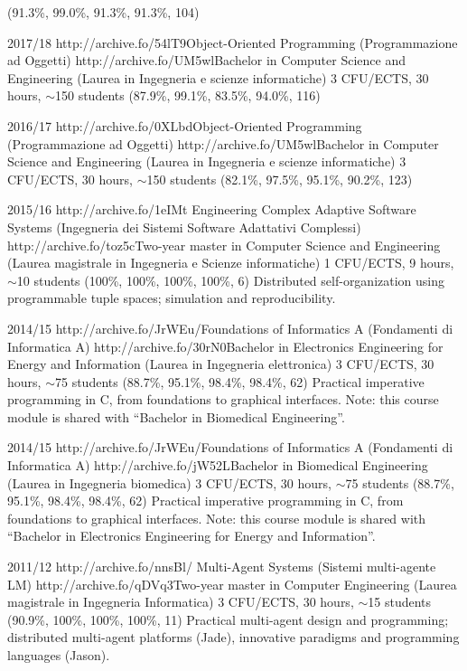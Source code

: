 \begin{outerlist}
        {(91.3\%, 99.0\%, 91.3\%, 91.3\%, 104)}
        {\oopjava}
    \item[2017/18]
        \unibocourse
        {http://archive.fo/54lT9}{Object-Oriented Programming (Programmazione ad Oggetti)}
        {http://archive.fo/UM5wl}{Bachelor in Computer Science and Engineering (Laurea in Ingegneria e scienze informatiche)}
        {3 CFU/ECTS, 30 hours, $\sim$150 students}
        {(87.9\%, 99.1\%, 83.5\%, 94.0\%, 116)}
        {\oopjava}
    \item[2016/17]
        \unibocourse
        {http://archive.fo/0XLbd}{Object-Oriented Programming (Programmazione ad Oggetti)}
        {http://archive.fo/UM5wl}{Bachelor in Computer Science and Engineering (Laurea in Ingegneria e scienze informatiche)}
        {3 CFU/ECTS, 30 hours, $\sim$150 students}
        {(82.1\%, 97.5\%, 95.1\%, 90.2\%, 123)}
        {\oopjava}
    \item[2015/16]
        \unibocourse
        {http://archive.fo/1eIMt}{
            Engineering Complex Adaptive Software Systems
            (Ingegneria dei Sistemi Software Adattativi Complessi)
        }
        {http://archive.fo/toz5c}{Two-year master in Computer Science and Engineering (Laurea magistrale in Ingegneria e Scienze informatiche)}
        {1 CFU/ECTS, 9 hours, $\sim$10 students}
        {(100\%, 100\%, 100\%, 100\%, 6)}
        {Distributed self-organization using programmable tuple spaces; simulation and reproducibility.}
    \item[2014/15]
        \unibocourse
        {http://archive.fo/JrWEu/}{Foundations of Informatics A (Fondamenti di Informatica A)}
        {http://archive.fo/30rN0}{Bachelor in Electronics Engineering for Energy and Information (Laurea in Ingegneria elettronica)}
        {3 CFU/ECTS, 30 hours, $\sim$75 students}
        {(88.7\%, 95.1\%, 98.4\%, 98.4\%, 62)}
        {
            Practical imperative programming in C, from foundations to graphical interfaces.
            Note: this course module is shared with ``Bachelor in Biomedical Engineering''.
        }
    \item[2014/15]
        \unibocourse
        {http://archive.fo/JrWEu/}{Foundations of Informatics A (Fondamenti di Informatica A)}
        {http://archive.fo/jW52L}{Bachelor in Biomedical Engineering (Laurea in Ingegneria biomedica)}
        {3 CFU/ECTS, 30 hours, $\sim$75 students}
        {(88.7\%, 95.1\%, 98.4\%, 98.4\%, 62)}
        {
            Practical imperative programming in C, from foundations to graphical interfaces.
            Note: this course module is shared with ``Bachelor in Electronics Engineering for Energy and Information''.
        }
    \item[2011/12]
        \unibocourse
        {http://archive.fo/nnsBl/}
        {Multi-Agent Systems (Sistemi multi-agente LM)}
        {http://archive.fo/qDVq3}{Two-year master in Computer Engineering (Laurea magistrale in Ingegneria Informatica)}
        {3 CFU/ECTS, 30 hours, $\sim$15 students}
        {(90.9\%, 100\%, 100\%, 100\%, 11)}
        {Practical multi-agent design and programming; distributed multi-agent platforms (Jade), innovative paradigms and programming languages (Jason).}
\end{outerlist}

